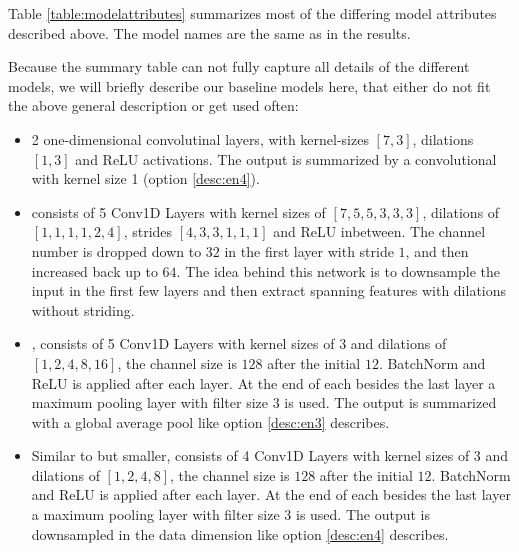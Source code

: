 Table \ref{table:modelattributes} summarizes most of the differing model attributes described above. The model names are the same as in the results.


Because the summary table can not fully capture all details of the different models, we will briefly describe our baseline models here, that either do not fit the above general description or get used often:
\begin{itemize}
	\item[\code{BL\_v0}] 2 one-dimensional convolutinal layers, with kernel-sizes $[7,3]$, dilations $[1, 3]$ and ReLU activations. The output is summarized by a convolutional with kernel size 1 (option \ref{desc:en4}).
	\item[\code{BL\_v0\_2}] consists of 5 Conv1D Layers with kernel sizes of $[7,5,5,3,3,3]$, dilations of $[1,1,1,1,2,4]$, strides $[4,3,3,1,1,1]$ and ReLU inbetween. The channel number is dropped down to $32$ in the first layer with stride $1$, and then increased back up to $64$. The idea behind this network is to downsample the input in the first few layers and then extract spanning features with dilations without striding.
	\item[\code{BL\_v2}] , consists of 5 Conv1D Layers with kernel sizes of $3$ and dilations of $[1,2,4,8,16]$, the channel size is $128$ after the initial $12$. BatchNorm and ReLU is applied after each layer. At the end of each besides the last layer a maximum pooling layer with filter size $3$ is used. The output is summarized with a global average pool like option \ref{desc:en3} describes.
	\item[\code{BL\_v8}] Similar to  but smaller,  consists of 4 Conv1D Layers with kernel sizes of $3$ and dilations of $[1,2,4,8]$, the channel size is $128$ after the initial $12$. BatchNorm and ReLU is applied after each layer. At the end of each besides the last layer a maximum pooling layer with filter size $3$ is used. The output is downsampled in the data dimension like option \ref{desc:en4} describes. 
\end{itemize}


